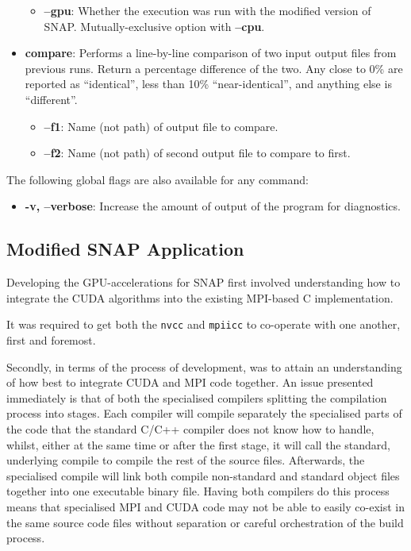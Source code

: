 \documentclass[conference]{IEEEtran}
\begin{document}
\begin{itemize}
\begin{itemize}
        \item \textbf{--gpu}: Whether the execution was run with the modified version of SNAP. Mutually-exclusive option with \textbf{--cpu}.
    \end{itemize}
    \item \textbf{compare}: Performs a line-by-line comparison of two input output files from previous runs. Return a percentage difference of the two. Any close to 0\% are reported as ``identical'', less than 10\% ``near-identical'', and anything else is ``different''.
    \begin{itemize}
        \item \textbf{--f1}: Name (not path) of output file to compare.
        \item \textbf{--f2}: Name (not path) of second output file to compare to first.
    \end{itemize}
\end{itemize}

The following global flags are also available for any command:

\begin{itemize}
    \item \textbf{-v, --verbose}: Increase the amount of output of the program for diagnostics.
\end{itemize}


\subsection{Modified SNAP Application}
\label{subsec:imp_mod_snap}

Developing the GPU-accelerations for SNAP first involved understanding how to integrate the CUDA algorithms into the existing MPI-based C implementation.

It was required to get both the \texttt{nvcc} and \texttt{mpiicc} to co-operate with one another, first and foremost.

Secondly, in terms of the process of development, was to attain an understanding of how best to integrate CUDA and MPI code together. An issue presented immediately is that of both the specialised compilers splitting the compilation process into stages. Each compiler will compile separately the specialised parts of the code that the standard C/C++ compiler does not know how to handle, whilst, either at the same time or after the first stage, it will call the standard, underlying compile to compile the rest of the source files. Afterwards, the specialised compile will link both compile non-standard and standard object files together into one executable binary file. Having both compilers do this process means that specialised MPI and CUDA code may not be able to easily co-exist in the same source code files without separation or careful orchestration of the build process.
\end{document}
